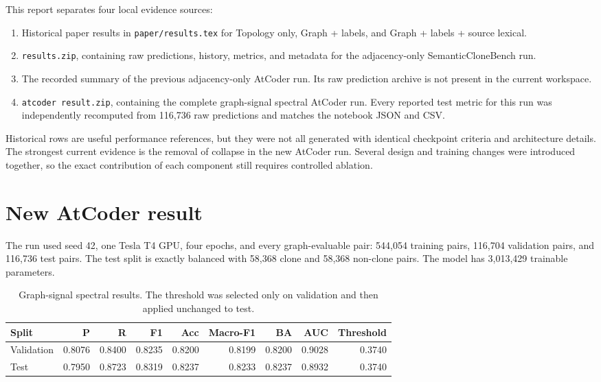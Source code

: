 \documentclass[11pt,a4paper]{article}
\newcommand{\code}[1]{\texttt{#1}}
\begin{document}
This report separates four local evidence sources:
\begin{enumerate}
\item Historical paper results in \code{paper/results.tex} for Topology only,
Graph + labels, and Graph + labels + source lexical.
\item \code{results.zip}, containing raw predictions, history, metrics, and
metadata for the adjacency-only SemanticCloneBench run.
\item The recorded summary of the previous adjacency-only AtCoder run. Its raw
prediction archive is not present in the current workspace.
\item \code{atcoder result.zip}, containing the complete graph-signal spectral
AtCoder run. Every reported test metric for this run was independently
recomputed from 116,736 raw predictions and matches the notebook JSON and CSV.
\end{enumerate}

Historical rows are useful performance references, but they were not all
generated with identical checkpoint criteria and architecture details. The
strongest current evidence is the removal of collapse in the new AtCoder run.
Several design and training changes were introduced together, so the exact
contribution of each component still requires controlled ablation.

\section{New AtCoder result}

The run used seed 42, one Tesla T4 GPU, four epochs, and every graph-evaluable
pair: 544,054 training pairs, 116,704 validation pairs, and 116,736 test
pairs. The test split is exactly balanced with 58,368 clone and 58,368
non-clone pairs. The model has 3,013,429 trainable parameters.

\begin{table}[H]
\centering
\small
\begin{tabular}{lrrrrrrrr}
\toprule
Split & P & R & F1 & Acc & Macro-F1 & BA & AUC & Threshold \\
\midrule
Validation & 0.8076 & 0.8400 & 0.8235 & 0.8200 & 0.8199 & 0.8200 & 0.9028 & 0.3740 \\
Test & 0.7950 & 0.8723 & 0.8319 & 0.8237 & 0.8233 & 0.8237 & 0.8932 & 0.3740 \\
\bottomrule
\end{tabular}
\caption{Graph-signal spectral results. The threshold was selected only on
validation and then applied unchanged to test.}
\end{table}
\end{document}
